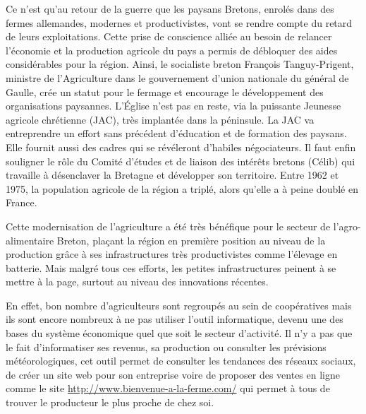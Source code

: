 \documentclass[a4paper,12pt]{report}
\begin{document}
			Ce n’est qu’au retour de la guerre que les paysans Bretons, enrolés dans des fermes allemandes, modernes et productivistes, vont se rendre compte du retard de leurs exploitations. Cette prise de conscience alliée au besoin de relancer l’économie et la production agricole du pays a permis de débloquer des aides considérables pour la région. Ainsi, le socialiste breton François Tanguy-Prigent, ministre de l'Agriculture dans le gouvernement d'union nationale du général de Gaulle, crée un statut pour le fermage et encourage le développement des organisations paysannes. L'Église n'est pas en reste, via la puissante Jeunesse agricole chrétienne (JAC), très implantée dans la péninsule. La JAC va entreprendre un effort sans précédent d'éducation et de formation des paysans. Elle fournit aussi des cadres qui se révéleront d'habiles négociateurs. Il faut enfin souligner le rôle du Comité d'études et de liaison des intérêts bretons (Célib) qui travaille à désenclaver la Bretagne et développer son territoire\cite{ModernisationAgricultureBretonne}. Entre 1962 et 1975, la population agricole de la région a triplé, alors qu’elle a à peine doublé en France.
			
			Cette modernisation de l’agriculture a été très bénéfique pour le secteur de l’agro-alimentaire Breton, plaçant la région en première position au niveau de la production grâce à ses infrastructures très productivistes comme l’élevage en batterie. Mais malgré tous ces efforts, les petites infrastructures peinent à se mettre à la page, surtout au niveau des innovations récentes. 
			
			En effet, bon nombre d’agriculteurs sont regroupés au sein de coopératives mais ils sont encore nombreux à ne pas utiliser l’outil informatique, devenu une des bases du système économique quel que soit le secteur d’activité\cite{FAIPeuInteresses,AdoptionTICAgricole}. Il n’y a pas que le fait d’informatiser ses revenus, sa production ou consulter les prévisions météorologiques, cet outil permet de consulter les tendances des réseaux sociaux, de créer un site web pour son entreprise voire de proposer des ventes en ligne comme le site \url{http://www.bienvenue-a-la-ferme.com/} qui permet à tous de trouver le producteur le plus proche de chez soi.
			
\end{document}
